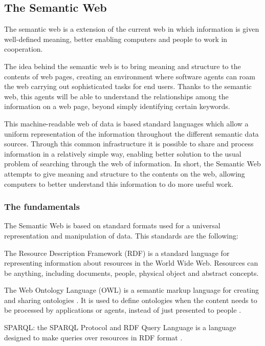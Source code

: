 \subsection{The Semantic Web}

The semantic web is a extension of the current web in which information is given well-defined meaning, better enabling computers and people to work in cooperation. \cite{berners2001semantic}

The idea behind the semantic web is to bring meaning and structure to the contents of web pages, creating an environment where software agents can roam the web carrying out sophisticated tasks for end users. Thanks to the semantic web, this agents will be able to understand the relationships among the information on a web page, beyond simply identifying certain keywords. 

This machine-readable web of data is based standard languages which allow a uniform representation of the information throughout the different semantic data sources. Through this common infrastructure it is possible to share and process information in a relatively simple way, enabling better solution to the usual problem of searching through the web of information. In short, the Semantic Web attempts to give meaning and structure to the contents on the web, allowing computers to better understand this information to do more useful work.

\subsubsection*{The fundamentals}

The Semantic Web is based on standard formats used for a universal representation and manipulation of data. This standards are the following:

\begin{description}
	\item[RDF:] The Resource Description Framework (RDF) is a standard language for representing information about resources in the World Wide Web. Resources can be anything, including documents, people, physical object and abstract concepts. \cite{rdfprimer10}
	
	\item[OWL:] The Web Ontology Language (OWL) is a semantic markup language for creating and sharing ontologies \cite{bechhofer2009owl}.  It is used to define ontologies when the content needs to be processed by applications or agents, instead of just presented to people \cite{mcguinness2004owl}. 

	\item{SPARQL:} the SPARQL Protocol and RDF Query Language is a language designed to make queries over resources in RDF format \cite{sparqlquery}. 
\end{description}

